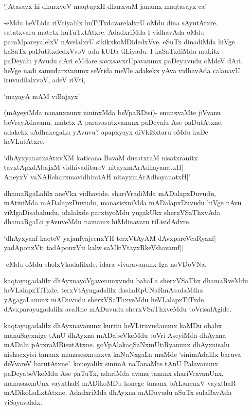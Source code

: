 \begin{shloka}
`jAtasayx hi dhurxvoV maqtuyxH dhurxvaM janamx maqtasayx ca'
\end{shloka} 

-eMdu heVLida riVtiyalilx huTiTxdavarelalxrU oMdu dina sAyutAtxre. satatxvaru matetx huTuTxtAtxre. AdadxriMda I vidhavAda oMdu paraMpareyalelxV nAvelalxrU sikikxkoMDidedxVve. eSuTx dinadiMda hiVge kaSaTx paDutitxdedxVvoV adu kUDa tiLiyadu. I kaSaTxdiMda mukitx paDeyalu yAvudu dAri eMdare savxsavxrUpavanunx paDeyuvudu oMdeV dAri. heVge nadi samudarxvanunx seVrida meVle adakekx yAva vidhavAda calanavU iruvudilalxvoV, adeV riVti, 

\begin{shloka}
`mayayA mAM viBajayx'
\end{shloka}

(mAyeyiMda nananxnunx nininxMda beVpaRDisi)- enunxvaMte jiVvanu beVreyAdavanu. matetx A paravasutxvanunx paDeyalu Ase paDutAtxne. adakekx sAdhanegaLu yAvuvu? apapxyayx diVkiSxtaru oMdu kaDe heVLutAtxre.-

\begin{shloka}
`dhAyxyanatxsAtxvXM katicana BavaM dusatxraM nisatxranitx\\
tavxtApxdAbajxM vidhivaditareV nitayxmArAdhayanatxH|\\
AneyxV vaNARsharxmavidhiratAH nitayxmArAdhayanatxH|'
\end{shloka}

dhamaRgaLalilx aneVka vidhavide. shariVradiMda mADalapxDuvudu, mAtiniMda mADalapxDuvudu, manasisxniMda mADalapxDuvudu hiVge nAvu viMgaDisabahudu. idalalxde parxtiyoMdu yugakUkx sherxVSaThxvAda dhamaRgaLu yAvuveMdu namamx hiMdinavaru tiLisidAdxre.

\begin{shloka}
`dhAyxyanf kaqteV yajanfyajecnxYH terxVtAyAM dAvxpareV\s caRyanf|\\
yadAponxVti tadAponxVti kalw saMkiVtayxRkeVshavamf||
\end{shloka}

-eMdu oMdu sholxVkadalilxde. idara vivaravanunx Iga noVDoVNa.

kaqtayugadalilx dhAyxnayoVgavenunxvudu bahaLa sherxVSaThx dhamaRveMdu heVLalapxTiTxde. terxVtAyugadalilx dashaRpUNaRmAsadaMtha yAgagaLanunx mADuvudu sherxVSaThxveMdu heVLalapxTiTxde. dAvxparayugadalilx acaRne mADuvudu sherxVSaThxveMdu toVrisalAgide.

kaqtayugadalilx dhAyxnavanunx kuritu heVLiruvudanunx kaMDu obabx manuSayxnige tAnU dhAyxna mADabeVkeMdu toVri AseyiMda dhAyxna mADalu pArxraMBisutAtxne. goVpAlakaqSaNxmUtiRyanunx dhAyxnisalu nishacxyisi tananx manasesxnunxva kaNuNxgaLa muMde `sinimAdalilx baruva deVvareV barutAtxne'. koneyalilx sinimA naTanaMte tAnU Palavanunx paDeyabeVkeMdu Ase paTuTx, adariMda avanu tananx shariVravanUnx, manasasxnUnx vayxthaR mADikoMDu konege tananx bALanenxV vayxthaR mADikoLuLxtAtxne. AdadxriMda dhAyxna mADuvudu aSuTx sulaBavAda viSayavalalx.

